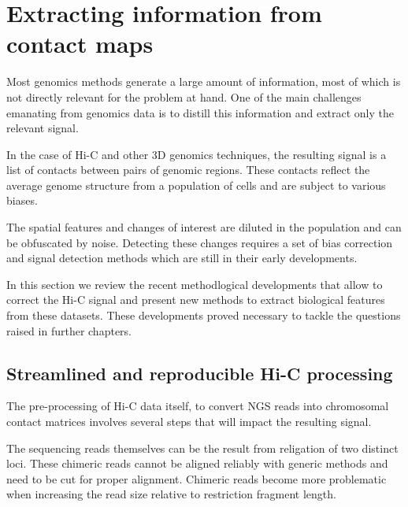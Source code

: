 
\chapter{Extracting information from contact maps} %

\label{ch:02-01} %


Most genomics methods generate a large amount of information, most of which is not directly relevant for the problem at hand. One of the main challenges emanating from genomics data is to distill this information and extract only the relevant signal.

In the case of Hi-C and other 3D genomics techniques, the resulting signal is a list of contacts between pairs of genomic regions. These contacts reflect the average genome structure from a population of cells and are subject to various biases.

The spatial features and changes of interest are diluted in the population and can be obfuscated by noise. Detecting these changes requires a set of bias correction and signal detection methods which are still in their early developments.

In this section we review the recent methodlogical developments that allow to correct the Hi-C signal and present new methods to extract biological features from these datasets. These developments proved necessary to tackle the questions raised in further chapters.

\section{Streamlined and reproducible Hi-C processing}

The pre-processing of Hi-C data itself, to convert \acrfull{NGS} reads into chromosomal contact matrices involves several steps that will impact the resulting signal.

The sequencing reads themselves can be the result from religation of two distinct loci. These chimeric reads cannot be aligned reliably with generic methods and need to be cut for proper alignment. Chimeric reads become more problematic when increasing the read size relative to restriction fragment length.

